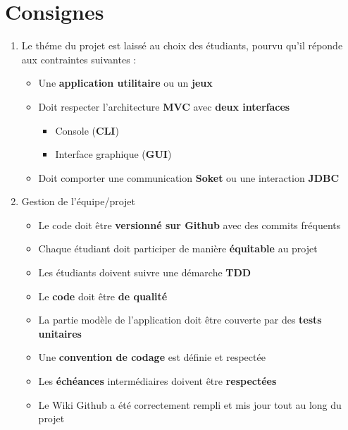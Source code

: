 \chapter*{Consignes}
\label{chap:Consignes}

\begin{enumerate}[I]
    \item Le théme du projet est laissé au choix des étudiants, pourvu qu’il réponde aux contraintes suivantes :
    \begin{itemize}
        \item Une \textbf{application utilitaire} ou un \textbf{jeux}
        \item Doit respecter l'architecture \textbf{MVC} avec \textbf{deux interfaces}
        \begin{itemize}
            \item Console (\textbf{CLI})
            \item Interface graphique (\textbf{GUI})
        \end{itemize}
        \item Doit comporter une communication \textbf{Soket} ou une interaction \textbf{JDBC}
    \end{itemize}   
    \item Gestion de l'équipe/projet
    \begin{itemize}
        \item Le code doit être  \textbf{versionné sur Github} avec des commits fréquents
        \item Chaque étudiant doit participer de manière \textbf{équitable} au projet
        \item Les étudiants doivent suivre une démarche \textbf{TDD}
        \item Le \textbf{code} doit être \textbf{de qualité}
        \item La partie modèle de l'application doit être couverte par des \textbf{tests unitaires}
        \item Une \textbf{convention de codage} est définie et respectée
        \item Les \textbf{échéances} intermédiaires doivent être \textbf{respectées}
        \item Le Wiki Github a été correctement rempli et mis jour tout au long du projet
        \end{itemize}
\end{enumerate}


